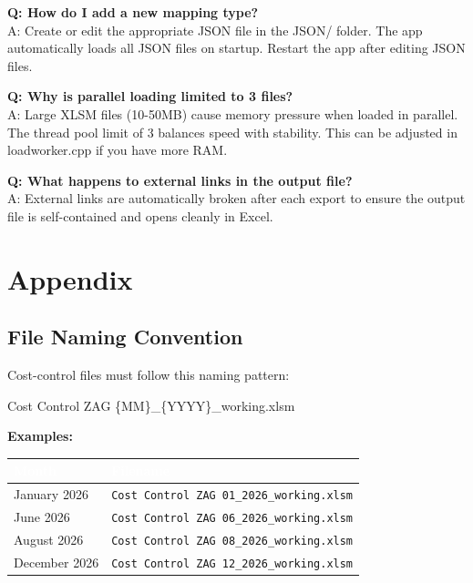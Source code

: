 \documentclass[11pt,a4paper]{article}
\begin{document}
\vspace{0.4cm}

\begin{stepbox}
\textbf{Q: How do I add a new mapping type?}\\
A: Create or edit the appropriate JSON file in the JSON/ folder. The app automatically loads all JSON files on startup. Restart the app after editing JSON files.
\end{stepbox}

\vspace{0.4cm}

\begin{stepbox}
\textbf{Q: Why is parallel loading limited to 3 files?}\\
A: Large XLSM files (10-50MB) cause memory pressure when loaded in parallel. The thread pool limit of 3 balances speed with stability. This can be adjusted in loadworker.cpp if you have more RAM.
\end{stepbox}

\vspace{0.4cm}

\begin{stepbox}
\textbf{Q: What happens to external links in the output file?}\\
A: External links are automatically broken after each export to ensure the output file is self-contained and opens cleanly in Excel.
\end{stepbox}

\section{Appendix}

\subsection{File Naming Convention}

Cost-control files must follow this naming pattern:

\begin{codebox}
Cost Control ZAG \{MM\}\_\{YYYY\}\_working.xlsm
\end{codebox}

\textbf{Examples:}

\begin{center}
\begin{tabularx}{0.88\linewidth}{@{} l X @{}}
\toprule
\rowcolor{PrimaryBlue}
\textcolor{White}{\textbf{Month}} & \textcolor{White}{\textbf{Filename}} \\
\midrule
January 2026   & \texttt{Cost Control ZAG 01\_2026\_working.xlsm} \\
June 2026      & \texttt{Cost Control ZAG 06\_2026\_working.xlsm} \\
August 2026    & \texttt{Cost Control ZAG 08\_2026\_working.xlsm} \\
December 2026  & \texttt{Cost Control ZAG 12\_2026\_working.xlsm} \\
\bottomrule
\end{tabularx}
\end{center}
\end{document}
